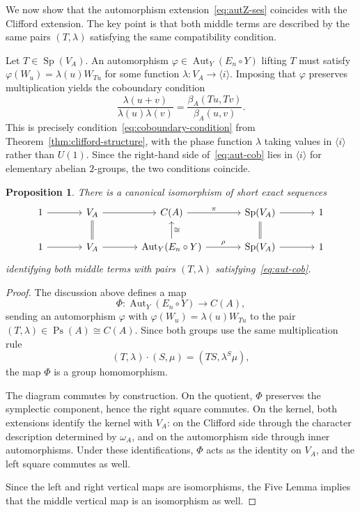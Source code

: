 \documentclass[11pt, reqno]{amsart}
\newtheorem{proposition}[theorem]{Proposition}
\theoremstyle{definition}
\theoremstyle{remark}
\DeclareMathOperator{\Aut}{Aut}
\DeclareMathOperator{\Sp}{Sp}
\DeclareMathOperator{\Ps}{Ps}
\begin{document}
We now show that the automorphism extension~\eqref{eq:autZ-ses} coincides with the Clifford extension. The key point is that both middle terms are described by the same pairs $(T,\lambda)$ satisfying the same compatibility condition.

Let $T \in \Sp(V_A)$. An automorphism $\varphi \in \Aut_Y(E_n \circ Y)$ lifting $T$ must satisfy $\varphi(W_u) = \lambda(u) W_{Tu}$ for some function $\lambda: V_A \to \langle i \rangle$. Imposing that $\varphi$ preserves multiplication yields the coboundary condition
\begin{equation}\label{eq:aut-cob}
\frac{\lambda(u+v)}{\lambda(u)\lambda(v)} = \frac{\beta_A(Tu, Tv)}{\beta_A(u, v)}.
\end{equation}
This is precisely condition~\eqref{eq:coboundary-condition} from Theorem~\ref{thm:clifford-structure}, with the phase function $\lambda$ taking values in $\langle i \rangle$ rather than $U(1)$. Since the right-hand side of~\eqref{eq:aut-cob} lies in $\langle i \rangle$ for elementary abelian $2$-groups, the two conditions coincide.

\begin{proposition}\label{prop:ses-ident}
There is a canonical isomorphism of short exact sequences
\[
\begin{tikzcd}[column sep=large]
1 \arrow[r] & V_A \arrow[r] \arrow[d, equals] & C(A) \arrow[r, "\pi"] & \Sp(V_A) \arrow[r] \arrow[d, equals] & 1 \\
1 \arrow[r] & V_A \arrow[r] & \Aut_Y(E_n \circ Y) \arrow[u, "\cong"'] \arrow[r, "\rho"] & \Sp(V_A) \arrow[r] & 1
\end{tikzcd}
\]
identifying both middle terms with pairs $(T, \lambda)$ satisfying~\eqref{eq:aut-cob}.
\end{proposition}

\begin{proof}
The discussion above defines a map
\[
\Phi: \Aut_Y(E_n \circ Y) \longrightarrow C(A),
\]
sending an automorphism $\varphi$ with $\varphi(W_u) = \lambda(u) W_{Tu}$ to the pair $(T, \lambda) \in \Ps(A) \cong C(A)$. Since both groups use the same multiplication rule
\[
(T, \lambda) \cdot (S, \mu) = (TS, \lambda^S \mu),
\]
the map $\Phi$ is a group homomorphism.

The diagram commutes by construction. On the quotient, $\Phi$ preserves the symplectic component, hence the right square commutes. On the kernel, both extensions identify the kernel with $V_A$: on the Clifford side through the character description determined by $\omega_A$, and on the automorphism side through inner automorphisms. Under these identifications, $\Phi$ acts as the identity on $V_A$, and the left square commutes as well.

Since the left and right vertical maps are isomorphisms, the Five Lemma implies that the middle vertical map is an isomorphism as well.
\end{proof}
\end{document}
